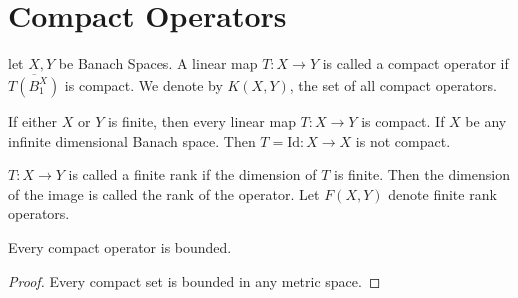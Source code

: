 \section{Compact Operators}
\begin{definition}
  let $X, Y$ be Banach Spaces. A linear map $T : X \to Y$ is called a
  compact operator if $\overline{T(B_1^X)}$ is compact. We denote by
  $K(X, Y)$, the set of all compact operators.
\end{definition}

\begin{example}
  If either $X$ or $Y$ is finite, then every linear map $T: X \to Y$
  is compact. If $X$ be any infinite dimensional Banach space. Then
  $T = \textrm{Id} : X \to X$ is not compact.
\end{example}

\begin{definition}
  $T: X \to Y$ is called a finite rank if the dimension of $T$ is
  finite. Then the dimension of the image is called the rank of the
  operator. Let $F(X, Y)$ denote finite rank operators.
\end{definition}

\begin{lemma}
  Every compact operator is bounded.
\end{lemma}
\begin{proof}
  Every compact set is bounded in any metric space.
\end{proof}

